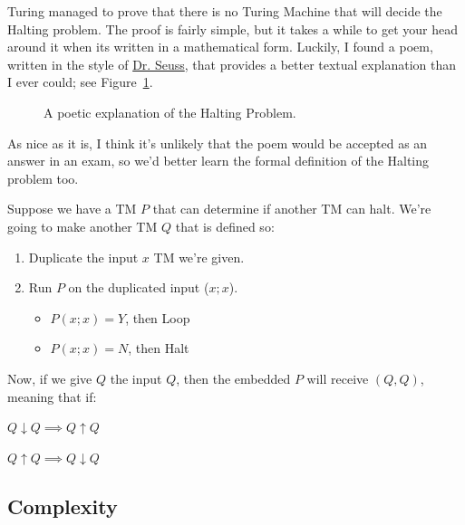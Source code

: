 Turing managed to prove that there is no Turing Machine that will decide the
Halting problem. The proof is fairly simple, but it takes a while to get your
head around it when its written in a mathematical form. Luckily, I found a poem,
written in the style of \href{https://en.wikipedia.org/wiki/Dr._Seuss}{Dr.
Seuss}, that provides a better textual explanation than I ever could; see
Figure~\ref{fig:halting-poem}.

\begin{figure}[h]
\begin{minipage}{\textwidth}
  \begin{mymulticols}
  
  \end{mymulticols}
  \restoregeometry
\end{minipage}
\caption{A poetic explanation of the Halting Problem.}
\label{fig:halting-poem}
\end{figure}

As nice as it is, I think it's unlikely that the poem would be accepted as an
answer in an exam, so we'd better learn the formal definition of the Halting
problem too.

Suppose we have a TM $P$ that can determine if another TM can halt. We're going
to make another TM $Q$ that is defined so:

\begin{enumerate}
  \item Duplicate the input $x$ TM we're given.
  \item Run $P$ on the duplicated input ($x;x$).
  \begin{itemize}
    \item[] $P(x;x) = Y$, then Loop 
    \item[] $P(x;x) = N$, then Halt
  \end{itemize}
\end{enumerate}

Now, if we give $Q$ the input $Q$, then the embedded $P$ will receive $(Q,Q)$,
meaning that if:

\begin{description}
  \item $Q \downarrow Q \implies Q \uparrow Q$
  \item $Q \uparrow Q \implies Q \downarrow Q$
\end{description}


\subsection{Complexity}

